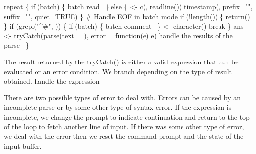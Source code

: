 \documentclass[a4paper]{article}%
\begin{document}
\nwenddocs{}\endmoddef\nwstartdeflinemarkup{}\nwenddeflinemarkup
repeat \{
    if (batch) \{
        \LA{}batch read~{\nwtagstyle{}}\RA{}
    \} else \{
         <- c(, readline())
        timestamp(, prefix="", suffix="", quiet=TRUE)
    \}
    # Handle EOF in batch mode
    if (!length()) \{
        return()
    \}
    if (grepl("^#", )) \{
        if (batch) \{
            \LA{}batch comment~{\nwtagstyle{}}\RA{}
        \}
         <- character()
        break
    \}
    ans <- tryCatch(parse(text = ), error = function(e) e)
    \LA{}handle the results of the parse~{\nwtagstyle{}}\RA{}
\}
\nwendcode{}\nwdocspar


The result returned by the {\Tt{}tryCatch()\nwendquote} is either a valid
expression that can be evaluated or an error condition. We branch
depending on the type of result obtained.
\nwenddocs{}\endmoddef\nwstartdeflinemarkup{}\nwenddeflinemarkup
\LA{}handle the expression~{\nwtagstyle{}}\RA{}
\nwendcode{}\nwdocspar

There are two possible types of error to deal with.  Errors can be
caused by an incomplete parse or by some other type of syntax error.
If the expression is incomplete, we change the prompt to indicate
continuation and return to the top of the loop to fetch another line
of input.  If there was some other type of error, we deal with
the error then we reset the command
prompt and the state of the input buffer.
\end{document}

